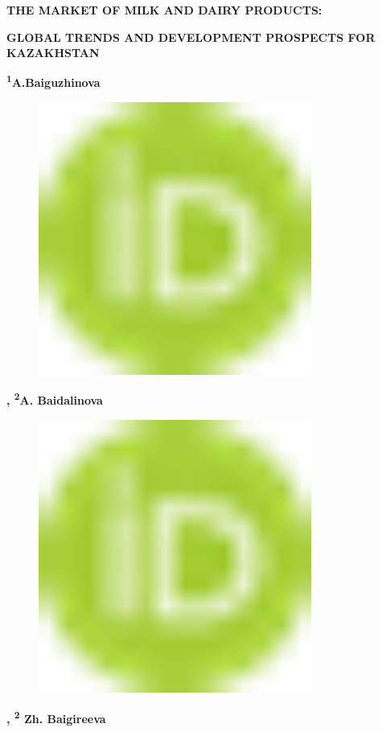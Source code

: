 
{\bfseries THE MARKET OF MILK AND DAIRY PRODUCTS:}

{\bfseries GLOBAL TRENDS AND DEVELOPMENT PROSPECTS FOR KAZAKHSTAN}

{\bfseries \textsuperscript{1}A.Baiguzhinova}
\begin{figure}[H]
	\centering
	\includegraphics[width=0.8\textwidth]{media/ekon2/image1}
	\caption*{}
\end{figure}
{\bfseries ,
\textsuperscript{2}A.
Baidalinova}
\begin{figure}[H]
	\centering
	\includegraphics[width=0.8\textwidth]{media/ekon2/image1}
	\caption*{}
\end{figure}
{\bfseries \textsuperscript{\envelope },
\textsuperscript{2} Zh. Baigireeva}

